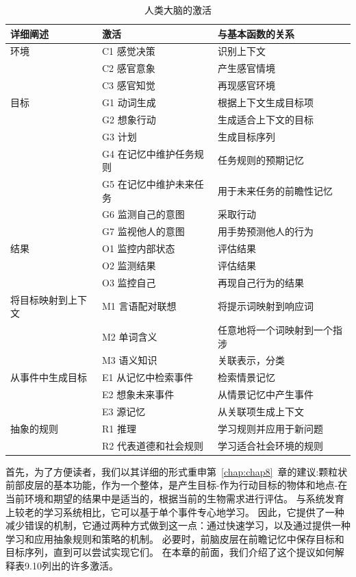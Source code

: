 \begin{table}[htbp] 
	\newcommand{\tabincell}[2]{\begin{tabular}{@{}#1@{}}#2\end{tabular}} %
	\centering
	\caption{人类大脑的激活\label{tab:9_10}}
	\renewcommand\arraystretch{1.5}	%
	\begin{tabular}{lll}
		\toprule
		详细阐述 & 激活 & 与基本函数的关系\\
		\midrule
		环境 & C1 感觉决策 & 识别上下文  \\
		& C2 感官意象 & 产生感官情境 \\
		& C3 感官知觉 & 再现感官环境 \\
		目标 & G1 动词生成 & 根据上下文生成目标项  \\
		& G2 想象行动 & 生成适合上下文的目标 \\
		& G3 计划 & 生成目标序列 \\
		& G4 在记忆中维护任务规则 & 任务规则的预期记忆 \\
		& G5 在记忆中维护未来任务 & 用于未来任务的前瞻性记忆 \\
		& G6 监测自己的意图 & 采取行动 \\
		& G7 监视他人的意图 & 用手势预测他人的行为 \\
		结果 & O1 监控内部状态 & 评估结果  \\
		& O2 监测结果 & 评估结果 \\
		& O3 监控自己 & 再现自己行为的结果 \\
		将目标映射到上下文 & M1 言语配对联想 & 将提示词映射到响应词  \\
		& M2 单词含义 & 任意地将一个词映射到一个指涉 \\
		& M3 语义知识 & 关联表示，分类 \\
		从事件中生成目标 & E1 从记忆中检索事件& 检索情景记忆  \\
		& E2 想象未来事件 & 从情景记忆中产生事件 \\
		& E3 源记忆 & 从关联项生成上下文 \\
		抽象的规则  & R1 推理 & 学习规则并应用于新问题  \\
		& R2 代表道德和社会规则 & 学习适合社会环境的规则 \\

		\bottomrule
		
	\end{tabular}%
\end{table}%


首先，为了方便读者，我们以其详细的形式重申第~\ref{chap:chap8}~章的建议:颗粒状前部皮层的基本功能，作为一个整体，是产生目标-作为行动目标的物体和地点-在当前环境和期望的结果中是适当的，根据当前的生物需求进行评估。
与系统发育上较老的学习系统相比，它可以基于单个事件专心地学习。
因此，它提供了一种减少错误的机制，它通过两种方式做到这一点：通过快速学习，以及通过提供一种学习和应用抽象规则和策略的机制。
必要时，前脑皮层在前瞻记忆中保存目标和目标序列，直到可以尝试实现它们。
在本章的前面，我们介绍了这个提议如何解释表9.10列出的许多激活。


